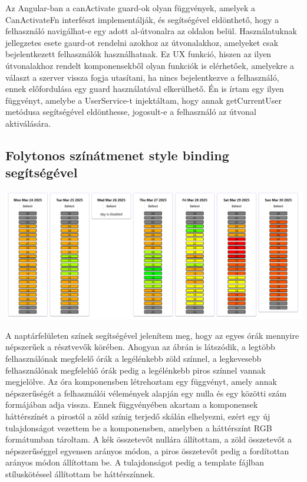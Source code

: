 \documentclass[a4paper,12pt]{report}
\theoremstyle{definition}
\theoremstyle{remark}
\begin{document}
Az Angular-ban a canActivate guard-ok olyan függvények, amelyek a CanActivateFn\cite{Guardwebsite} interfészt implementálják, és segítségével eldönthető, hogy a felhasználó navigálhat-e egy adott al-útvonalra az oldalon belül. Használatuknak jellegzetes esete gaurd-ot rendelni azokhoz az útvonalakhoz, amelyeket csak bejelentkezett felhasználók használhatnak. Ez UX funkció, hiszen az ilyen útvonalakhoz rendelt komponensekből olyan funkciók is elérhetőek, amelyekre a választ a szerver vissza fogja utasítani, ha nincs bejelentkezve a felhasználó, ennek előfordulása egy guard használatával elkerülhető. Én is írtam egy ilyen függvényt, amelybe a UserService-t injektáltam, hogy annak getCurrentUser metódusa segítségével eldönthesse, jogosult-e a felhasználó az útvonal aktiválására.

	\subsection{Folytonos színátmenet style binding segítségével}

\begin{center}
\includegraphics[width=160mm]{week_view}
\captionsetup{width=0.8\linewidth}
\end{center}

A naptárfelületen színek segítségével jelenítem meg, hogy az egyes órák mennyire népszerűek a résztvevők körében. Ahogyan az ábrán is látszódik, a legtöbb felhasználónak megfelelő órák a legélénkebb zöld színnel, a legkevesebb felhasználónak megfelelúő órák pedig a legélénkebb piros színnel vannak megjelölve. Az óra komponensben létrehoztam egy függvényt, amely annak népszerűségét a felhasználói vélemények alapján egy nulla és egy közötti szám formájában adja vissza. Ennek függvényében akartam a komponensek háttérszínét a pirostól a zöld színig terjedő skálán elhelyezni, ezért egy új tulajdonságot vezettem be a komponensben, amelyben a háttérszínt RGB formátumban tároltam. A kék összetevőt nullára állítottam, a zöld összetevőt a népszerűséggel egyensen arányos módon, a piros összetevőt pedig a fordítottan arányos módon állítottam be. A tulajdonságot pedig a template fájlban stíluskötéssel állítottam be háttérszínnek.
\end{document}
